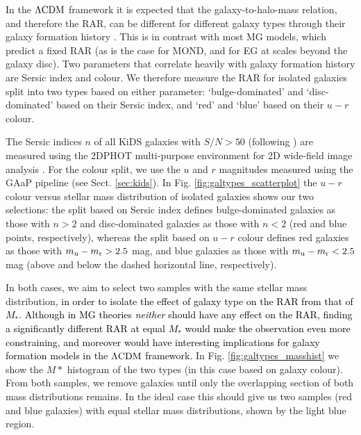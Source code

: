 \documentclass[usenatbib]{mnras}
\newcommand{\lcdm}{{\rm \Lambda CDM}}
\newcommand{\un}[1]{_{\rm #1}}
\begin{document}
In the $\lcdm$ framework it is expected that the galaxy-to-halo-mass relation, and therefore the RAR, can be different for different galaxy types through their galaxy formation history \cite[]{dutton2010,matthee2017,posti2019,marasco2020}. This is in contrast with most MG models, which predict a fixed RAR (as is the case for MOND, and for EG at scales beyond the galaxy disc). Two parameters that correlate heavily with galaxy formation history are Sersic index and colour. We therefore measure the RAR for isolated galaxies split into two types based on either parameter: `bulge-dominated' and `disc-dominated' based on their Sersic index, and `red' and `blue' based on their $u-r$ colour.

The Sersic indices $n$ of all KiDS galaxies with $S/N > 50$ (following \cite{roy2018}) are measured using the \textsc{2DPHOT} multi-purpose environment for 2D wide-field image analysis \cite[]{barbera2008}. For the colour split, we use the $u$ and $r$ magnitudes measured using the GAaP pipeline (see Sect. \ref{sec:kids}). In Fig. \ref{fig:galtypes_scatterplot} the $u-r$ colour versus stellar mass distribution of isolated galaxies shows our two selections: the split based on Sersic index defines bulge-dominated galaxies as those with $n > 2$ and disc-dominated galaxies as those with $n<2$ (red and blue points, respectively), whereas the split based on $u-r$ colour defines red galaxies as those with $m\un{u} - m\un{r} > 2.5$ mag, and blue galaxies as those with $m\un{u} - m\un{r} < 2.5$ mag (above and below the dashed horizontal line, respectively).

In both cases, we aim to select two samples with the same stellar mass distribution, \textcolor{black}{in order to isolate the effect of galaxy type on the RAR from that of $M_*$. Although in MG theories \emph{neither} should have any effect on the RAR, finding a significantly different RAR at equal $M_*$ would make the observation even more constraining, and moreover would have interesting implications for galaxy formation models in the $\lcdm$ framework.} In Fig. \ref{fig:galtypes_masshist} we show the $M*$ histogram of the two types (in this case based on galaxy colour). From both samples, we remove galaxies until only the overlapping section of both mass distributions remains. In the ideal case this should give us two samples (red and blue galaxies) with equal stellar mass distributions, shown by the light blue region.
\end{document}
